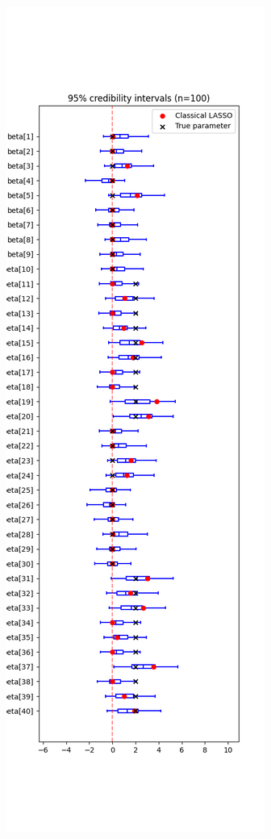 \documentclass[a4paper, 10pt]{article}
\begin{document}
\begin{figure}[htb]
    \begin{center}
        \vspace{-4cm}
        \begin{minipage}{.47\textwidth}
            \centering
            \includegraphics[width=\textwidth]{../outputs/artificial_scenarios_n=20/scenario_4/credibility_intervals.png}

\end{minipage}
\end{center}
\end{figure}
\end{document}
